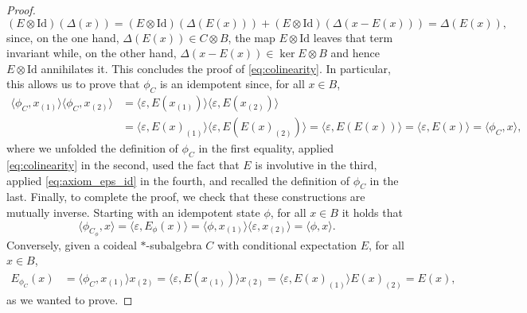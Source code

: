 \documentclass[a4paper,10pt]{amsart}
\newcommand{\eval}[2]{\langle #1 , #2\rangle}
\theoremstyle{definition}
\begin{document}
\begin{proof}
    \[
        (E\otimes \mathrm{Id})(\Delta(x)) =
        (E\otimes \mathrm{Id})(\Delta(E(x))) + (E\otimes \mathrm{Id})(\Delta(x-E(x))) = \Delta(E(x)),
    \]
    since, on the one hand, $\Delta(E(x))\in C\otimes B$, the map $E\otimes \mathrm{Id}$ leaves that term invariant while, on the other hand, $\Delta(x-E(x)) \in \ker E \otimes B$ and hence $E\otimes \mathrm{Id}$ annihilates it. This concludes the proof of \cref{eq:colinearity}.
    \smallbreak\noindent%
    In particular, this allows us to prove that $\phi_C$ is an idempotent since, for all $x\in B$,
    \begin{align*}
        \eval{\phi_C}{x_{(1)}}\eval{\phi_C}{x_{(2)}}
        &=
        \eval{\varepsilon}{E(x_{(1)})}\eval{\varepsilon}{E(x_{(2)})}
        \\&
        =
        \eval{\varepsilon}{E(x)_{(1)}}\eval{\varepsilon}{E(E(x)_{(2)})}
        =
        \eval{\varepsilon}{E(E(x))} = \eval{\varepsilon}{E(x)} = \eval{\phi_C}{x},
    \end{align*}
    where we unfolded the definition of $\phi_C$ in the first equality, applied \cref{eq:colinearity} in the second, used the fact that $E$ is involutive in the third, applied \cref{eq:axiom_eps_id} in the fourth, and recalled the definition of $\phi_C$ in the last. 
    \smallbreak\noindent%
    Finally, to complete the proof, we check that these constructions are mutually inverse.
    Starting with an idempotent state $\phi$, for all $x\in B$ it holds that
    \[ 
        \eval{\phi_{C_\phi}}{x}
        =
        \eval{\varepsilon}{E_\phi(x)}
        =
        \eval{\phi}{x_{(1)}}
            \eval{\varepsilon}{x_{(2)}}
        =
        \eval{\phi}{x}.
    \]
    Conversely, given a coideal $*$-sub\-al\-ge\-bra $C$ with conditional expectation $E$, for all $x\in B$,
    \begin{align*}
        E_{\phi_C}(x)
        &=
        \eval{\phi_C}{x_{(1)}}x_{(2)}
        =
        \eval{\varepsilon}{E(x_{(1)})}  x_{(2)}
        =
        \eval{\varepsilon}{E(x)_{(1)}}  E(x)_{(2)}=E(x),
    \end{align*}
    as we wanted to prove.
\end{proof}
\end{document}
